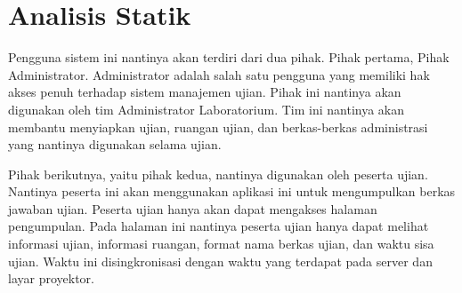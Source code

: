 \section{Analisis Statik}


Pengguna sistem ini nantinya akan terdiri dari dua pihak. Pihak pertama, Pihak
Administrator. Administrator adalah salah satu pengguna yang memiliki hak akses
penuh terhadap sistem manajemen ujian. Pihak ini nantinya akan digunakan oleh
tim Administrator Laboratorium. Tim ini nantinya akan membantu menyiapkan ujian,
ruangan ujian, dan berkas-berkas administrasi yang nantinya digunakan selama
ujian.

Pihak berikutnya, yaitu pihak kedua, nantinya digunakan oleh peserta ujian.
Nantinya peserta ini akan menggunakan aplikasi ini untuk mengumpulkan berkas
jawaban ujian. Peserta ujian hanya akan dapat mengakses halaman pengumpulan.
Pada halaman ini nantinya peserta ujian hanya dapat melihat informasi ujian,
informasi ruangan, format nama berkas ujian, dan waktu sisa ujian. Waktu ini
disingkronisasi dengan waktu yang terdapat pada server dan layar proyektor.